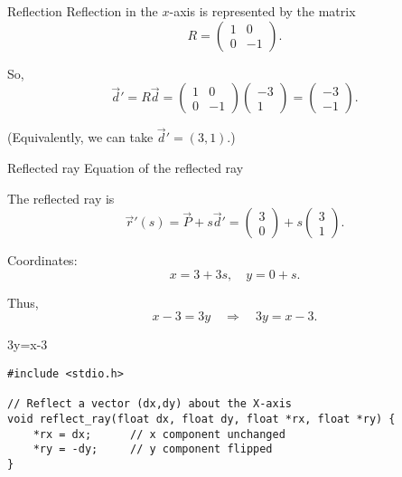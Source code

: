 \documentclass{beamer}
\begin{document}
\begin{frame}{Reflection}
Reflection in the $x$-axis is represented by the matrix
\[
R=\begin{pmatrix}1 & 0\\[4pt] 0 & -1\end{pmatrix}.
\]

So,
\[
\vec{d}'=R\vec{d}
=\begin{pmatrix}1 & 0\\ 0 & -1\end{pmatrix}
\begin{pmatrix}-3\\1\end{pmatrix}
=\begin{pmatrix}-3\\-1\end{pmatrix}.
\]

(Equivalently, we can take $\vec{d}'=(3,1)$.)


\end{frame}

\begin{frame}{Reflected ray}
Equation of the reflected ray


The reflected ray is
\[
\vec{r}'(s)=\vec{P}+s\vec{d}'
=\begin{pmatrix}3\\0\end{pmatrix}+s\begin{pmatrix}3\\1\end{pmatrix}.
\]

Coordinates:
\[
x=3+3s, \quad y=0+s.
\]

Thus,
\[
x-3=3y \quad \Rightarrow \quad 3y=x-3.
\]

  \; 3y=x-3 
\end{frame}

\begin{frame}[fragile]
    \begin{lstlisting}
#include <stdio.h>

// Reflect a vector (dx,dy) about the X-axis
void reflect_ray(float dx, float dy, float *rx, float *ry) {
    *rx = dx;      // x component unchanged
    *ry = -dy;     // y component flipped
}

     \end{lstlisting}
\end{frame}
\end{document}
